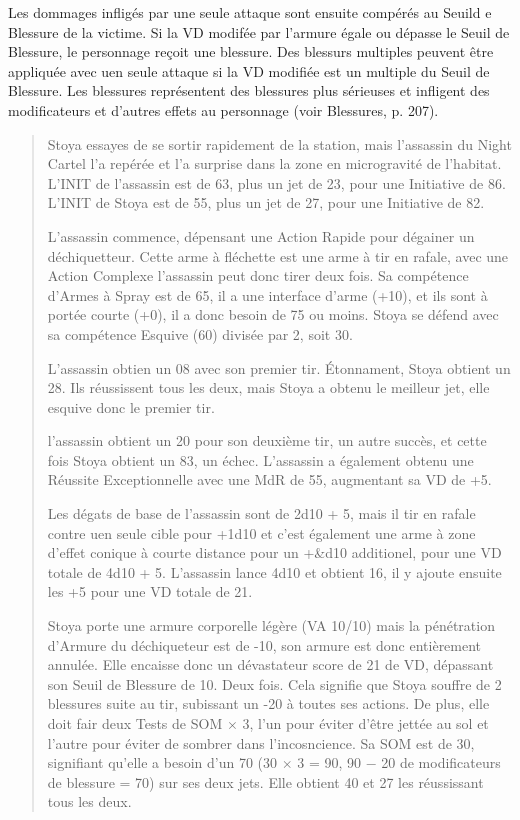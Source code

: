 Les dommages infligés par une seule attaque sont ensuite compérés au Seuild e Blessure de la victime. Si la VD modifée par l'armure égale ou dépasse le Seuil de Blessure, le personnage reçoit une blessure. Des blessurs multiples peuvent être appliquée avec uen seule attaque si la VD modifiée est un multiple du Seuil de Blessure. Les blessures représentent des blessures plus sérieuses et infligent des modificateurs et d'autres effets au personnage (voir Blessures, p. 207). 

\begin{quotation} Stoya essayes de se sortir rapidement de la station, mais l'assassin du  Night Cartel l'a repérée et l'a surprise dans la zone en microgravité de l'habitat. L'INIT de l'assassin est de 63, plus un jet de 23, pour une Initiative de 86. L'INIT de Stoya est de 55, plus un jet de 27, pour une Initiative de 82. 

L'assassin commence, dépensant une Action Rapide pour dégainer un déchiquetteur. Cette arme à fléchette est une arme à tir en rafale, avec une Action Complexe l'assassin peut donc tirer deux fois. Sa compétence d'Armes à Spray est de 65, il a une interface d'arme (+10), et ils sont à portée courte (+0), il a donc besoin de 75 ou moins. Stoya se défend avec sa compétence Esquive (60) divisée par 2, soit 30. 

L'assassin obtien un 08 avec son premier tir. Étonnament, Stoya obtient un 28. Ils réussissent tous les deux, mais Stoya a obtenu le meilleur jet, elle esquive donc le premier tir. 

l'assassin obtient un 20 pour son deuxième tir, un autre succès, et cette fois Stoya obtient un 83, un échec. L'assassin a également obtenu une Réussite Exceptionnelle avec une MdR de 55, augmentant sa VD de +5. 

Les dégats de base de l'assassin sont de 2d10 + 5, mais il tir en rafale contre uen seule cible pour +1d10 et c'est également une arme à zone d'effet conique à courte distance pour un +&d10 additionel, pour une VD totale de 4d10 + 5. L'assassin lance 4d10 et obtient 16, il y ajoute ensuite les +5 pour une VD totale de 21. 

Stoya porte une armure corporelle légère (VA 10/10) mais la pénétration d'Armure du déchiqueteur est de -10, son armure est donc entièrement annulée. Elle encaisse donc un dévastateur score de 21 de VD, dépassant son Seuil de Blessure de 10. Deux fois. Cela signifie que Stoya souffre de 2 blessures suite au tir, subissant un -20 à toutes ses actions. De plus, elle doit fair deux Tests de SOM $\times$ 3, l'un pour éviter d'être jettée au sol et l'autre pour éviter de sombrer dans l'incosncience. Sa SOM est de 30, signifiant qu'elle a besoin d'un 70 (30 $\times$ 3 = 90, 90 $-$ 20 de modificateurs de blessure = 70) sur ses deux jets. Elle obtient 40 et 27 les réussissant tous les deux. 


\end{quotation}

